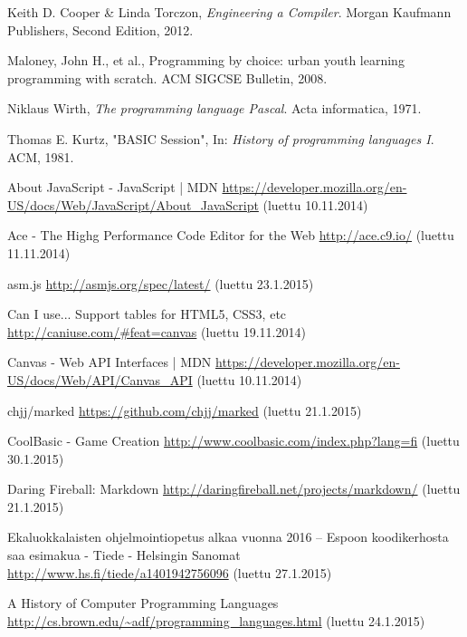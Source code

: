 
\begin{thebibliography}{99}

	Keith D. Cooper \& Linda Torczon,
	\emph{Engineering a Compiler}.
	Morgan Kaufmann Publishers,
	Second Edition,
	2012.

	Maloney, John H., et al.,
	Programming by choice: urban youth learning programming with scratch.
	ACM SIGCSE Bulletin,
	2008.
	
	Niklaus Wirth,
	\emph{The programming language Pascal}.
	Acta informatica,
	1971.

	Thomas E. Kurtz,
	"BASIC Session",
	In: \emph{History of programming languages I}.
	ACM,
	1981.

	
	About JavaScript - JavaScript | MDN \url{https://developer.mozilla.org/en-US/docs/Web/JavaScript/About_JavaScript} (luettu 10.11.2014)
	
	Ace - The Highg Performance Code Editor for the Web \url{http://ace.c9.io/} (luettu 11.11.2014)

	asm.js \url{http://asmjs.org/spec/latest/} (luettu 23.1.2015)
	
	Can I use... Support tables for HTML5, CSS3, etc \url{http://caniuse.com/#feat=canvas} (luettu 19.11.2014)
	
	Canvas - Web API Interfaces | MDN \url{https://developer.mozilla.org/en-US/docs/Web/API/Canvas_API} (luettu 10.11.2014)

	chjj/marked \url{https://github.com/chjj/marked} (luettu 21.1.2015)
	
	CoolBasic - Game Creation \url{http://www.coolbasic.com/index.php?lang=fi} (luettu 30.1.2015)

	Daring Fireball: Markdown \url{http://daringfireball.net/projects/markdown/} (luettu 21.1.2015)
	
	Ekaluokkalaisten ohjelmointiopetus alkaa vuonna 2016 – Espoon koodikerhosta saa esimakua - Tiede - Helsingin Sanomat \url{http://www.hs.fi/tiede/a1401942756096} (luettu 27.1.2015)
	
	A History of Computer Programming Languages \url{http://cs.brown.edu/~adf/programming_languages.html} (luettu 24.1.2015)
	

\end{thebibliography}
